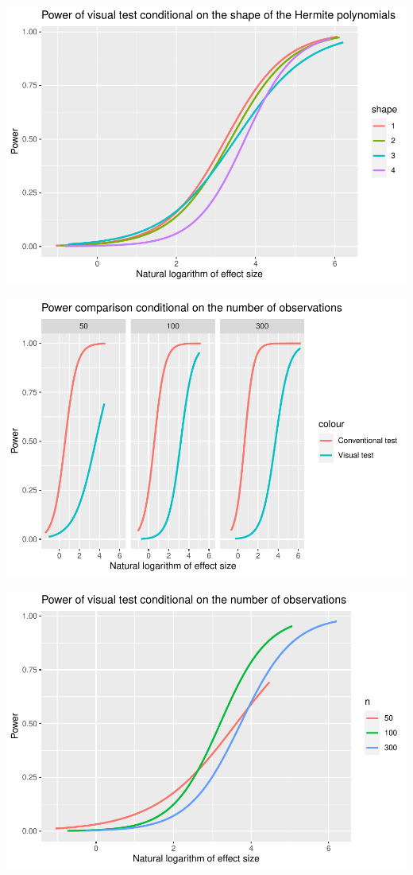 \documentclass[]{interact}
\theoremstyle{plain}%
\theoremstyle{definition}
\theoremstyle{remark}
\begin{document}
\includegraphics{paper_comparison_files/figure-latex/power-of-visual-test-given-shape-1.pdf}

\includegraphics{paper_comparison_files/figure-latex/power-vs-log-effect-size-given-number-of-observations-1.pdf}

\includegraphics{paper_comparison_files/figure-latex/power-of-visual-test-given-number-of-observations-1.pdf}
\end{document}
